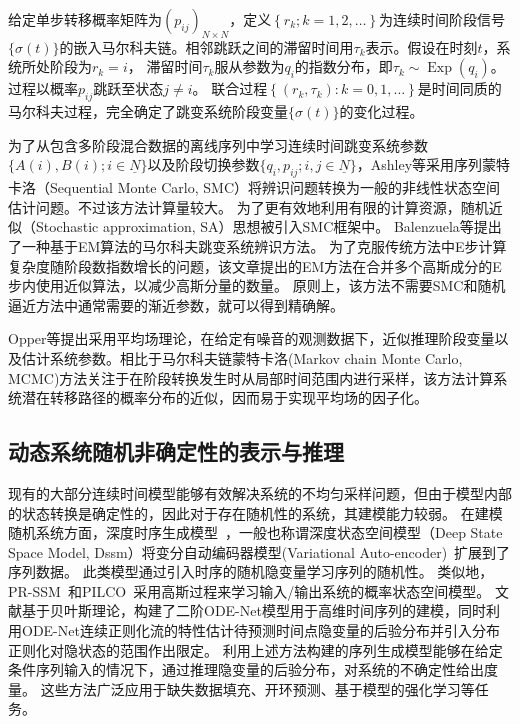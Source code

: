 给定单步转移概率矩阵为$\left(p_{i j}\right)_{N \times N}$，定义$\left\{r_k ; k=1,2, \ldots\right\}$为连续时间阶段信号$\{\sigma(t)\}$的嵌入马尔科夫链。相邻跳跃之间的滞留时间用$\tau_k$表示。假设在时刻$t$，系统所处阶段为$r_k=i$，
滞留时间$\tau _k$服从参数为$q_i$的指数分布，即$\tau_k\sim \operatorname{Exp}(q_i)$。
过程以概率$p_{ij}$跳跃至状态$j\neq i$。
联合过程$\left\{\left(r_k, \tau_k\right): k=0,1, \ldots\right\}$是时间同质的马尔科夫过程，完全确定了跳变系统阶段变量$\{\sigma(t)\}$的变化过程。



为了从包含多阶段混合数据的离线序列中学习连续时间跳变系统参数$\{A(i),B(i);i \in \underline{N}\}$以及阶段切换参数$\{q_i,p_{ij};i,j \in \underline{N}\}$，Ashley等采用序列蒙特卡洛（Sequential Monte Carlo, SMC）\cite{ashley2014sequential}将辨识问题转换为一般的非线性状态空间估计问题。不过该方法计算量较大。
为了更有效地利用有限的计算资源，随机近似（Stochastic approximation, SA）\cite{svensson2014identification,opper2007variational}思想被引入SMC框架中。
Balenzuela等提出了一种基于EM算法的马尔科夫跳变系统辨识方法\cite{balenzuela2022parameter}。
为了克服传统方法中E步计算复杂度随阶段数指数增长的问题，该文章提出的EM方法在合并多个高斯成分的E步内使用近似算法，以减少高斯分量的数量。
原则上，该方法不需要SMC和随机逼近方法中通常需要的渐近参数，就可以得到精确解。

Opper等\cite{opper2007variational}提出采用平均场理论，在给定有噪音的观测数据下，近似推理阶段变量以及估计系统参数。相比于马尔科夫链蒙特卡洛(Markov chain Monte Carlo, MCMC)方法关注于在阶段转换发生时从局部时间范围内进行采样，该方法计算系统潜在转移路径的概率分布的近似，因而易于实现平均场的因子化。

\subsection{动态系统随机非确定性的表示与推理}
现有的大部分连续时间模型能够有效解决系统的不均匀采样问题，但由于模型内部的状态转换是确定性的，因此对于存在随机性的系统，其建模能力较弱。
在建模随机系统方面，深度时序生成模型~\cite{Fraccaro2016,Chung2015,Karl2017}，一般也称谓深度状态空间模型（Deep State Space Model, Dssm）将变分自动编码器模型(Variational Auto-encoder)~\cite{kingma2013auto}扩展到了序列数据。
此类模型通过引入时序的随机隐变量学习序列的随机性。
类似地，PR-SSM~\cite{doerr2018probabilistic}和PILCO~\cite{deisenroth2011pilco}采用高斯过程来学习输入/输出系统的概率状态空间模型。
文献\cite{Yildiz2019}基于贝叶斯理论，构建了二阶ODE-Net模型用于高维时间序列的建模，同时利用ODE-Net连续正则化流的特性估计待预测时间点隐变量的后验分布并引入分布正则化对隐状态的范围作出限定。
利用上述方法构建的序列生成模型能够在给定条件序列输入的情况下，通过推理隐变量的后验分布，对系统的不确定性给出度量。
这些方法广泛应用于缺失数据填充\cite{Fraccaro2017}、开环预测\cite{Hafner2019}、基于模型的强化学习等任务\cite{Hafner2019}。

